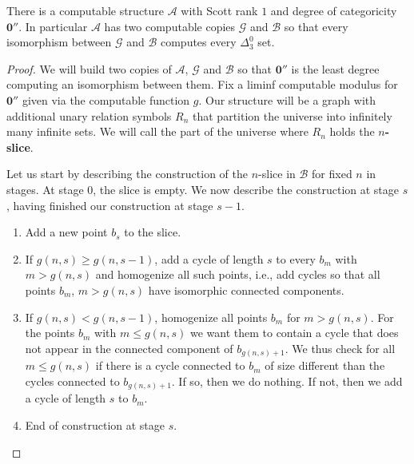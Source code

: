 \documentclass{amsart}
\newcommand\+[1]{\mathcal{#1}}
\renewcommand\*[1]{\mathbf{#1}}
\renewcommand\=[1]{\text{#1}}
\renewcommand\*[1]{\mathbf{#1}}
\newcommand{\A}{\mathcal{A}}
\newcommand{\B}{\mathcal{B}}
\newcommand{\mc}[1]{\mathcal{#1}}
\newcommand{\define}[1]{\textbf{#1}}
\begin{document}
 \begin{lemma}\label{lem:sr1dgcat''}
   There is a computable structure $\A$ with Scott rank $1$ and degree of categoricity $\mathbf 0''$. In particular $\A$ has two computable copies $\mathcal{G}$ and $\B$ so that every isomorphism between $\+G$ and $\B$ computes every $\Delta^0_3$ set.
 \end{lemma}
 \begin{proof}
   We will build two copies of $\A$, $\mc G$ and $\B$ so that $\mathbf 0''$ is the least degree computing an isomorphism between them. Fix a liminf computable modulus for $\mathbf 0''$ given via the computable function $g$. Our structure will be a graph with additional unary relation symbols $R_n$ that partition the universe into infinitely many infinite sets. We will call the part of the universe where $R_n$ holds the \define{$n$-slice}.

   Let us start by describing the construction of the $n$-slice in $\B$ for fixed $n$ in stages.
   At stage $0$, the slice is empty. We now describe the construction at stage $s$, having finished our construction at stage $s-1$.
   \begin{enumerate}
     \item Add a new point $b_s$ to the slice.
     \item If $g(n,s)\geq g(n,s-1)$, add a cycle of length $s$ to every $b_m$ with $m>g(n,s)$ and homogenize all such points, i.e., add cycles so that all points $b_m$, $m>g(n,s)$ have isomorphic connected components.
     \item If $g(n,s)<g(n,s-1)$, homogenize all points $b_m$ for $m>g(n,s)$. For the points $b_m$ with $m\leq g(n,s)$ we want them to contain a cycle that does not appear in the connected component of $b_{g(n,s)+1}$. We thus check for all $m\leq g(n,s)$ if there is a cycle connected to $b_m$ of size different than the cycles connected to $b_{g(n,s)+1}$. If so, then we do nothing. If not, then we add a cycle of length $s$ to $b_m$.
     \item End of construction at stage $s$.
   \end{enumerate}


\end{proof}
\end{document}
